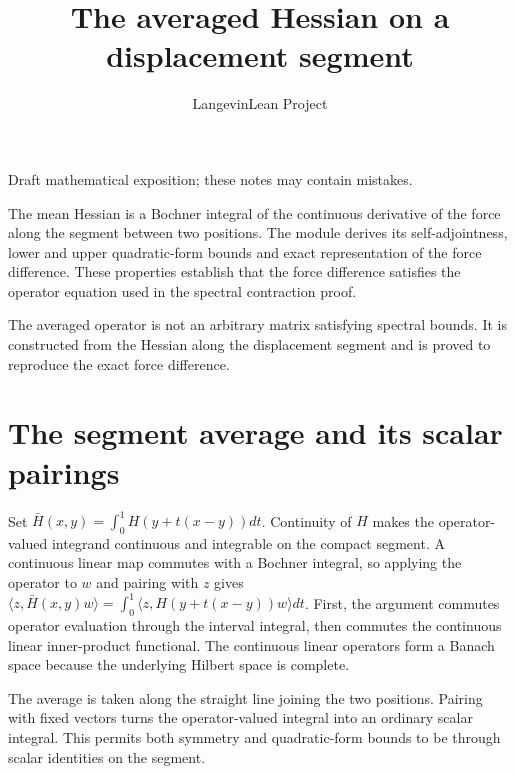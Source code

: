 \documentclass[11pt,a4paper]{article}
\title{\texorpdfstring{The averaged Hessian on a displacement segment}{The averaged Hessian on a displacement segment}}
\author{LangevinLean Project}
\date{}
\begin{document}
\maketitle
Draft mathematical exposition; these notes may contain mistakes.


The mean Hessian is a Bochner integral of the continuous derivative of the force along the segment between two positions. The module derives its self-adjointness, lower and upper quadratic-form bounds and exact representation of the force difference. These properties establish that the force difference satisfies the operator equation used in the spectral contraction proof.



The averaged operator is not an arbitrary matrix satisfying spectral bounds. It is constructed from the Hessian along the displacement segment and is proved to reproduce the exact force difference.


\section{\texorpdfstring{The segment average and its scalar pairings}{The segment average and its scalar pairings}}


Set \(\bar H(x,y)=\int_0^1H(y+t(x-y))dt\). Continuity of \(H\) makes the operator-valued integrand continuous and integrable on the compact segment. A continuous linear map commutes with a Bochner integral, so applying the operator to \(w\) and pairing with \(z\) gives \(\langle z,\bar H(x,y)w\rangle=\int_0^1\langle z,H(y+t(x-y))w\rangle dt\). First, the argument commutes operator evaluation through the interval integral, then commutes the continuous linear inner-product functional. The continuous linear operators form a Banach space because the underlying Hilbert space is complete.



The average is taken along the straight line joining the two positions. Pairing with fixed vectors turns the operator-valued integral into an ordinary scalar integral. This permits both symmetry and quadratic-form bounds to be through scalar identities on the segment.
\end{document}

